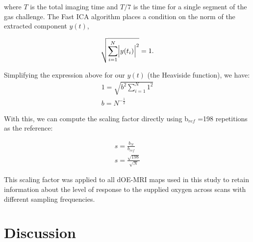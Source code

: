 where $T$ is the total imaging time and $T/7$ is the time for a single segment of the gas challenge.
The Fast \acs{ICA} algorithm places a condition on the norm of the extracted component $y(t)$,

\begin{equation}
\sqrt{\sum_{i=1}^{N} \Bigl|y(t_i)\Bigr|^2} = 1.
\end{equation}

Simplifying the expression above for our $y(t)$ (the Heaviside function), we have:
\begin{align}
1 = \sqrt{b^2 \sum_{i=1}^{N} 1^2} \nonumber \\
b = N^{-\frac{1}{2}}
\end{align}

With this, we can compute the scaling factor directly using b$_{ref}$ =198 repetitions as the reference:

\begin{align}
s = \frac{b_{N}}{b_{ref}} \nonumber \\
s = \frac{\sqrt{198}}{\sqrt{N}} 
\end{align}

This scaling factor was applied to all \acs{dOE-MRI} maps used in this study to retain information about the level of response to the supplied oxygen across scans with different sampling frequencies.

\section{Discussion}

